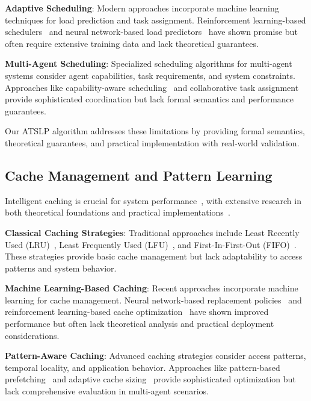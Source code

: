\documentclass[conference]{IEEEtran}
\begin{document}
\textbf{Adaptive Scheduling}: Modern approaches incorporate machine learning techniques for load prediction and task assignment. Reinforcement learning-based schedulers~\cite{rl_scheduler2019} and neural network-based load predictors~\cite{nn_load2020} have shown promise but often require extensive training data and lack theoretical guarantees.

\textbf{Multi-Agent Scheduling}: Specialized scheduling algorithms for multi-agent systems consider agent capabilities, task requirements, and system constraints. Approaches like capability-aware scheduling~\cite{capability_sched2021} and collaborative task assignment~\cite{collab_task2022} provide sophisticated coordination but lack formal semantics and performance guarantees.

Our ATSLP algorithm addresses these limitations by providing formal semantics, theoretical guarantees, and practical implementation with real-world validation.

\subsection{Cache Management and Pattern Learning}

Intelligent caching is crucial for system performance~\cite{lru1970,lfu1994,fifo1995,hennessy2019computer}, with extensive research in both theoretical foundations and practical implementations~\cite{patterson2017computer,stallings2017computer}.

\textbf{Classical Caching Strategies}: Traditional approaches include Least Recently Used (LRU)~\cite{lru1970}, Least Frequently Used (LFU)~\cite{lfu1994}, and First-In-First-Out (FIFO)~\cite{fifo1995}. These strategies provide basic cache management but lack adaptability to access patterns and system behavior.

\textbf{Machine Learning-Based Caching}: Recent approaches incorporate machine learning for cache management. Neural network-based replacement policies~\cite{nn_cache2018} and reinforcement learning-based cache optimization~\cite{rl_cache2019} have shown improved performance but often lack theoretical analysis and practical deployment considerations.

\textbf{Pattern-Aware Caching}: Advanced caching strategies consider access patterns, temporal locality, and application behavior. Approaches like pattern-based prefetching~\cite{pattern_prefetch2020} and adaptive cache sizing~\cite{adaptive_size2021} provide sophisticated optimization but lack comprehensive evaluation in multi-agent scenarios.
\end{document}
